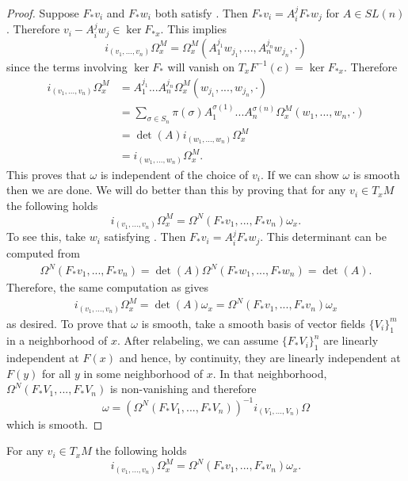 \begin{proof}
 Suppose $F_*v_i$ and $F_*w_i$ both satisfy .  Then $F_*v_i=A_i^jF_*w_j$ for $A\in SL(n)$. Therefore $v_i-A_i^jw_j\in \ker F_{*x}$.  This implies
\begin{equation}
i_{(v_1,...,v_n)}\Omega^M_x=\Omega^M_x(A_1^{j_1}w_{j_1},...,A_n^{j_n}w_{j_n},\cdot)
\end{equation}
since the terms involving $\ker F_*$ will vanish on $T_x F^{-1}(c)=\ker F_{*x}$.  Therefore
\begin{align}\label{ind_of_v_proof}
i_{(v_1,...,v_n)}\Omega^M_x&=A_1^{j_1}...A_n^{j_n}\Omega^M_x(w_{j_1},...,w_{j_n},\cdot)\\
&=\sum_{\sigma\in S_n} \pi(\sigma)A_1^{\sigma(1)}...A_n^{\sigma(n)}\Omega^M_x(w_1,...,w_n,\cdot)\\
&=\det(A)i_{(w_1,...,w_n)}\Omega^M_x\\
&=i_{(w_1,...,w_n)}\Omega^M_x.
\end{align}
This proves that $\omega$ is independent of the choice of $v_i$.  If we can show $\omega$ is smooth then we are done.  We will do better than this by proving that for any  $v_i\in T_xM$ the following holds
\begin{equation}
i_{(v_1,...,v_n)}\Omega^M_x=\Omega^N(F_*v_1,...,F_*v_n)\omega_x.
\end{equation}
To see this, take $w_i$ satisfying .  Then $F_*v_i=A_i^j F_*w_j$. This determinant can be computed from
\begin{align}
\Omega^N(F_*v_1,...,F_*v_n)=\det(A)\Omega^N(F_*w_1,...,F_*w_n)=\det(A).
\end{align}
 Therefore, the same computation as  gives
\begin{align}
i_{(v_1,...,v_n)}\Omega^M_x=\det(A)\omega_x=\Omega^N(F_*v_1,...,F_*v_n)\omega_x
\end{align}
as desired.  To prove that $\omega$ is smooth, take a smooth basis of vector fields $\{V_i\}_1^m$ in a neighborhood of $x$.  After relabeling, we can assume $\{F_*V_i\}_1^n$ are linearly independent at $F(x)$ and hence, by continuity, they are linearly independent at $F(y)$ for all $y$ in some neighborhood of $x$.  In that neighborhood, $\Omega^N(F_*V_1,...,F_*V_n)$ is non-vanishing and therefore
\begin{equation}
\omega=(\Omega^N(F_*V_1,...,F_*V_n))^{-1}i_{(V_1,...,V_n)}\Omega
\end{equation} 
which is smooth.
\end{proof}

\begin{corollary}\label{induced_vol_eq}
For any  $v_i\in T_xM$ the following holds
\begin{equation}\label{vol_formula1}
i_{(v_1,...,v_n)}\Omega^M_x=\Omega^N(F_*v_1,...,F_*v_n)\omega_x.
\end{equation}
\end{corollary}



